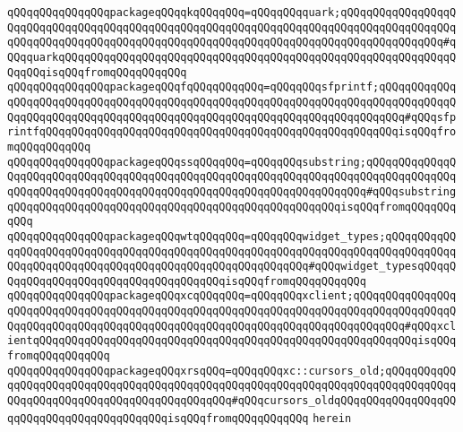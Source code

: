 \verb|qQQqqQQqqQQqqQQqpackageqQQqqkqQQqqQQq=qQQqqQQqquark;qQQqqQQqqQQqqQQqqQQqqQQqqQQqqQQqqQQqqQQqqQQqqQQqqQQqqQQqqQQqqQQqqQQqqQQqqQQqqQQqqQQqqQQqqQQqqQQqqQQqqQQqqQQqqQQqqQQqqQQqqQQqqQQqqQQqqQQqqQQqqQQqqQQqqQQqqQQq#qQQqquarkqQQqqQQqqQQqqQQqqQQqqQQqqQQqqQQqqQQqqQQqqQQqqQQqqQQqqQQqqQQqqQQqqQQqisqQQqfromqQQqqQQqqQQq|\newline
\verb|qQQqqQQqqQQqqQQqpackageqQQqfqQQqqQQqqQQq=qQQqqQQqsfprintf;qQQqqQQqqQQqqQQqqQQqqQQqqQQqqQQqqQQqqQQqqQQqqQQqqQQqqQQqqQQqqQQqqQQqqQQqqQQqqQQqqQQqqQQqqQQqqQQqqQQqqQQqqQQqqQQqqQQqqQQqqQQqqQQqqQQqqQQqqQQqqQQq#qQQqsfprintfqQQqqQQqqQQqqQQqqQQqqQQqqQQqqQQqqQQqqQQqqQQqqQQqqQQqqQQqisqQQqfromqQQqqQQqqQQq|\newline
\verb|qQQqqQQqqQQqqQQqpackageqQQqssqQQqqQQq=qQQqqQQqsubstring;qQQqqQQqqQQqqQQqqQQqqQQqqQQqqQQqqQQqqQQqqQQqqQQqqQQqqQQqqQQqqQQqqQQqqQQqqQQqqQQqqQQqqQQqqQQqqQQqqQQqqQQqqQQqqQQqqQQqqQQqqQQqqQQqqQQqqQQqqQQq#qQQqsubstringqQQqqQQqqQQqqQQqqQQqqQQqqQQqqQQqqQQqqQQqqQQqqQQqqQQqisqQQqfromqQQqqQQqqQQq|\newline
\verb|qQQqqQQqqQQqqQQqpackageqQQqwtqQQqqQQq=qQQqqQQqwidget_types;qQQqqQQqqQQqqQQqqQQqqQQqqQQqqQQqqQQqqQQqqQQqqQQqqQQqqQQqqQQqqQQqqQQqqQQqqQQqqQQqqQQqqQQqqQQqqQQqqQQqqQQqqQQqqQQqqQQqqQQqqQQqqQQq#qQQqwidget_typesqQQqqQQqqQQqqQQqqQQqqQQqqQQqqQQqqQQqqQQqisqQQqfromqQQqqQQqqQQq|\newline
\verb|qQQqqQQqqQQqqQQqpackageqQQqxcqQQqqQQq=qQQqqQQqxclient;qQQqqQQqqQQqqQQqqQQqqQQqqQQqqQQqqQQqqQQqqQQqqQQqqQQqqQQqqQQqqQQqqQQqqQQqqQQqqQQqqQQqqQQqqQQqqQQqqQQqqQQqqQQqqQQqqQQqqQQqqQQqqQQqqQQqqQQqqQQqqQQqqQQq#qQQqxclientqQQqqQQqqQQqqQQqqQQqqQQqqQQqqQQqqQQqqQQqqQQqqQQqqQQqqQQqqQQqisqQQqfromqQQqqQQqqQQq|\newline
\verb|qQQqqQQqqQQqqQQqpackageqQQqxrsqQQq=qQQqqQQqxc::cursors_old;qQQqqQQqqQQqqQQqqQQqqQQqqQQqqQQqqQQqqQQqqQQqqQQqqQQqqQQqqQQqqQQqqQQqqQQqqQQqqQQqqQQqqQQqqQQqqQQqqQQqqQQqqQQqqQQqqQQq#qQQqcursors_oldqQQqqQQqqQQqqQQqqQQqqQQqqQQqqQQqqQQqqQQqqQQqisqQQqfromqQQqqQQqqQQq|\newline
\verb|herein|\newline
